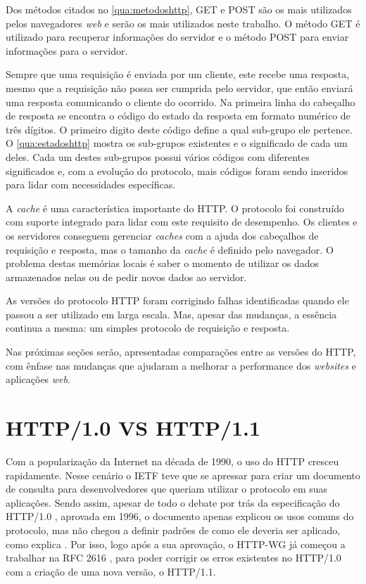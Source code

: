 

Dos métodos citados no \autoref{qua:metodoshttp}, GET e POST são os mais utilizados pelos navegadores \textit{web} e serão os mais utilizados neste trabalho. O método GET é utilizado para recuperar informações do servidor e o método POST para enviar informações para o servidor.

Sempre que uma requisição é enviada por um cliente, este recebe uma resposta, mesmo que a requisição não possa ser cumprida pelo servidor, que então enviará uma resposta comunicando o cliente do ocorrido. Na primeira linha do cabeçalho de resposta se encontra o código do estado da resposta em formato numérico de três dígitos. O primeiro digito deste código define a qual sub-grupo ele pertence. O \autoref{qua:estadoshttp} mostra os sub-grupos existentes e o significado de cada um deles. Cada um destes sub-grupos possui vários códigos  com diferentes significados e, com a evolução do protocolo, mais códigos foram sendo inseridos para lidar com necessidades específicas.



A \textit{cache} é uma característica importante do HTTP. O protocolo foi construído com suporte integrado para lidar com este requisito de desempenho. Os clientes e os servidores conseguem gerenciar \textit{caches} com a ajuda dos cabeçalhos de requisição e resposta, mas o tamanho da \textit{cache} é definido pelo navegador. O problema destas memórias locais é saber o momento de utilizar os dados armazenados nelas ou de pedir novos dados ao servidor.

As versões do protocolo HTTP foram corrigindo falhas identificadas quando ele passou a ser utilizado em larga escala. Mas, apesar das mudanças, a essência continua a mesma: um simples protocolo de requisição e resposta.

Nas próximas seções serão, apresentadas comparações entre as versões do HTTP, com ênfase nas mudanças que ajudaram a melhorar a performance dos \textit{websites} e aplicações \textit{web}.

\section{HTTP/1.0 VS HTTP/1.1}
\label{sec:http_10_vs_http_11}

Com a popularização da Internet na década de 1990, o uso do HTTP cresceu rapidamente. Nesse cenário o IETF teve que se apressar para criar um documento de consulta para desenvolvedores que queriam utilizar o protocolo em suas aplicações. Sendo assim, apesar de todo o debate por trás da especificação do HTTP/1.0 \cite{RFC1945}, aprovada em 1996, o documento apenas explicou os usos comuns do protocolo, mas não chegou a definir padrões de como ele deveria ser aplicado, como explica . Por isso, logo após a sua aprovação, o HTTP-WG já começou a trabalhar na RFC 2616 \cite{RFC2616}, para poder corrigir os erros existentes no HTTP/1.0 com a criação de uma nova versão, o HTTP/1.1.

